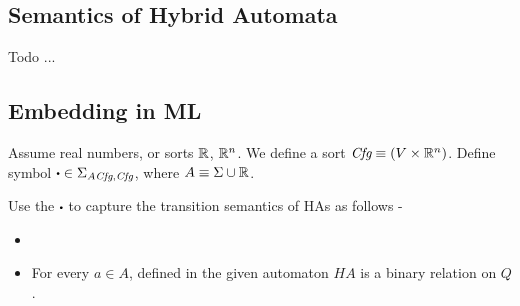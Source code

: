 \documentclass[]{article}
\begin{document}
\subsection{Semantics of Hybrid Automata}
Todo ...



\subsection{Embedding in ML}
Assume real numbers, or sorts $\mathbb{R}$, $\mathbb{R}^{n}$. We define a sort $\textit{Cfg} \equiv (V
\times \mathbb{R}^{n})$. Define symbol $\sbullet \in \Sigma_{A \Cfg, \Cfg}$, where $A
\equiv \Sigma \cup \mathbb{R}$.

Use the $\sbullet$ to capture the transition semantics of HAs as follows -
\begin{itemize}
  \item
  \item For every $a \in A$, defined in the given automaton $HA$ is a binary
    relation on $Q$.
\end{itemize}
\end{document}
